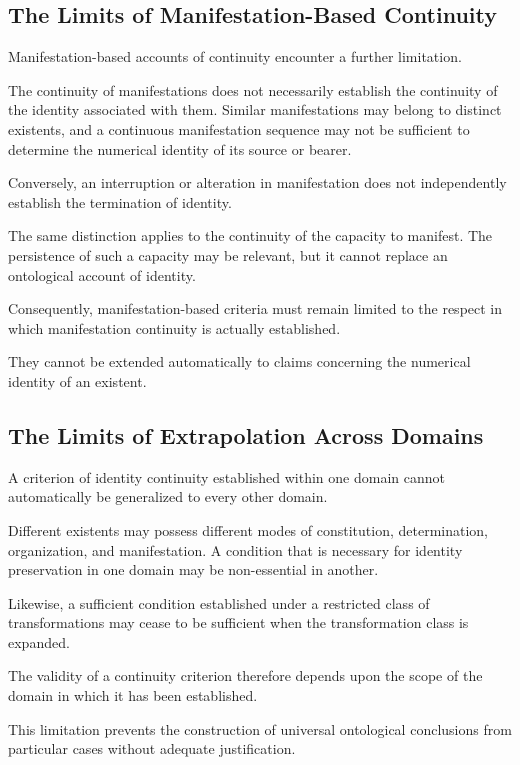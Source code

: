 \subsection{The Limits of Manifestation-Based Continuity}

Manifestation-based accounts of continuity encounter
a further limitation.

The continuity of manifestations does not necessarily
establish the continuity of the identity associated
with them. Similar manifestations may belong to
distinct existents, and a continuous manifestation
sequence may not be sufficient to determine the
numerical identity of its source or bearer.

Conversely, an interruption or alteration in
manifestation does not independently establish
the termination of identity.

The same distinction applies to the continuity
of the capacity to manifest. The persistence of
such a capacity may be relevant, but it cannot
replace an ontological account of identity.

Consequently, manifestation-based criteria must
remain limited to the respect in which manifestation
continuity is actually established.

They cannot be extended automatically to claims
concerning the numerical identity of an existent.

\subsection{The Limits of Extrapolation Across Domains}

A criterion of identity continuity established
within one domain cannot automatically be generalized
to every other domain.

Different existents may possess different modes
of constitution, determination, organization,
and manifestation. A condition that is necessary
for identity preservation in one domain may be
non-essential in another.

Likewise, a sufficient condition established
under a restricted class of transformations
may cease to be sufficient when the transformation
class is expanded.

The validity of a continuity criterion therefore
depends upon the scope of the domain in which
it has been established.

This limitation prevents the construction of
universal ontological conclusions from particular
cases without adequate justification.

